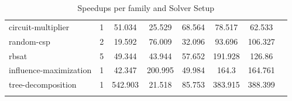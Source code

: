 \documentclass[12pt,a4paper,twoside]{scrartcl}
\numberwithin{equation}{section}
\begin{document}
\begin{longtable}{ lccccccc }
  circuit-multiplier	            &	1	&	51.034	&	25.529	&	68.564	&	78.517	&	62.533      \\
  random-csp	                    &	2	&	19.592	&	76.009	&	32.096	&	93.696	&	106.327     \\
  rbsat	                          &	5	&	49.344	&	43.944	&	57.652	&	191.928	&	126.86      \\
  influence-maximization	        &	1	&	42.347	&	200.995	&	49.984	&	164.3	&	164.761     \\
  tree-decomposition	            &	1	&	542.903	&	21.518	&	85.753	&	383.915	&	388.399     \\
  \bottomrule
  \caption{Speedups per family and Solver Setup}
  \label{tab:speedupsFamiliesComplete}
\end{longtable}



\end{document}

